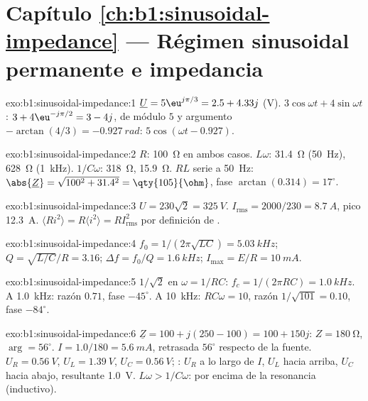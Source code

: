 \section*{Capítulo \ref{ch:b1:sinusoidal-impedance} --- Régimen sinusoidal permanente e impedancia}

\begin{solution}{exo:b1:sinusoidal-impedance:1}
$\underline U = 5\eu^{j\pi/3} = 2.5 + 4.33j$ (V). $3\cos\omega t +
4\sin\omega t$: $3 + 4\eu^{-j\pi/2} = 3 - 4j$, de módulo $5$ y argumento
$-\arctan(4/3) = \qty{-0.927}{rad}$: $5\cos(\omega t - 0.927)$.
\end{solution}

\begin{solution}{exo:b1:sinusoidal-impedance:2}
$R$: \qty{100}{\ohm} en ambos casos. $L\omega$: \qty{31.4}{\ohm} (\qty{50}{Hz}),
\qty{628}{\ohm} (\qty{1}{kHz}). $1/C\omega$: \qty{318}{\ohm}, \qty{15.9}{\ohm}.
$RL$ serie a \qty{50}{Hz}: $\abs{\underline Z} = \sqrt{100^2 + 31.4^2} =
\qty{105}{\ohm}$, fase $\arctan(0.314) = 17^\circ$.
\end{solution}

\begin{solution}{exo:b1:sinusoidal-impedance:3}
$U = 230\sqrt2 = \qty{325}{V}$. $I_{\mathrm{rms}} = 2000/230 = \qty{8.7}{A}$,
pico \qty{12.3}{A}. $\langle Ri^2\rangle = R\langle i^2\rangle =
RI_{\mathrm{rms}}^2$ por definición de .
\end{solution}

\begin{solution}{exo:b1:sinusoidal-impedance:4}
$f_0 = 1/(2\pi\sqrt{LC}) = \qty{5.03}{kHz}$; $Q = \sqrt{L/C}/R = 3.16$;
$\Delta f = f_0/Q = \qty{1.6}{kHz}$; $I_{\max} = E/R = \qty{10}{mA}$.
\end{solution}

\begin{solution}{exo:b1:sinusoidal-impedance:5}
$1/\sqrt2$ en $\omega = 1/RC$: $f_c = 1/(2\pi RC) = \qty{1.0}{kHz}$. A
\qty{1.0}{kHz}: razón $0.71$, fase $-45^\circ$. A \qty{10}{kHz}:
$RC\omega = 10$, razón $1/\sqrt{101} = 0.10$, fase $-84^\circ$.
\end{solution}

\begin{solution}{exo:b1:sinusoidal-impedance:6}
$\underline Z = 100 + j(250 - 100) = 100 + 150j$: $Z = \qty{180}{\ohm}$,
$\arg = 56^\circ$. $I = 1.0/180 = \qty{5.6}{mA}$, retrasada $56^\circ$
respecto de la fuente. $U_R = \qty{0.56}{V}$, $U_L = \qty{1.39}{V}$, $U_C = \qty{0.56}{V}$;
: $U_R$ a lo largo de $I$, $U_L$ hacia arriba, $U_C$ hacia abajo,
resultante \qty{1.0}{V}. $L\omega > 1/C\omega$: por encima de la resonancia (inductivo).
\end{solution}

